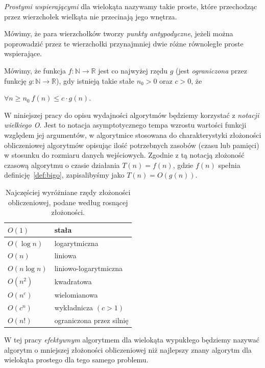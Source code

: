 \begin{definicja}
  \emph{Prostymi wspierającymi} dla wielokąta nazywamy takie proste,
  które przechodząc przez wierzchołek wielkąta nie przecinają jego
  wnętrza.
\end{definicja}

\begin{definicja}
  Mówimy, że para wierzchołków tworzy \emph{punkty antypodyczne},
  jeżeli można poprowadzić przez te wierzchołki przynajmniej dwie
  różne równoległe proste wspierające.
\end{definicja}

\begin{definicja}\label{def:bigo}
  Mówimy, że funkcja $f\colon \mathbb{N} \to \mathbb{R}$ jest co
  najwyżej rzędu $g$ (jest \emph{ograniczona} przez funkcję $g\colon
  \mathbb{N} \to \mathbb{R}$), gdy istnieją takie stałe $n_0 > 0$ oraz
  $c > 0$, że

  \begin{center}
    $\forall n \geq n_0\ f(n) \leq c \cdot g(n)$.
  \end{center}
\end{definicja}

W niniejszej pracy do opisu wydajności algorytmów będziemy korzystać z
\emph{notacji wielkiego O}. Jest to notacja asymptotycznego tempa
wzrostu wartości funkcji względem jej argumentów, w algorytmice
stosowana do charakterystyki złożoności obliczeniowej algorytmów
opisując ilość potrzebnych zasobów (czasu lub pamięci) w stosunku do
rozmiaru danych wejściowych. Zgodnie z tą notacją złożoność czasową
algorytmu o czasie działania $T(n) = f(n)$, gdzie $f(n)$ spełnia
definicję~\ref{def:bigo}, zapisalibyśmy jako $T(n) = O(g(n))$.

\begin{table}[htb]
  \centering

  \begin{tabular}{ll}
    \toprule
    $O(1)$ & stała \\
    \midrule
    $O(\log n)$ & logarytmiczna \\
    \midrule
    $O(n)$ & liniowa \\
    \midrule
    $O(n \log n)$ & liniowo-logarytmiczna \\
    \midrule
    $O(n^2)$ & kwadratowa \\
    \midrule
    $O(n^c)$ & wielomianowa \\
    \midrule
    $O(c^n)$ & wykładnicza $(c > 1)$ \\
    \midrule
    $O(n!)$ & ograniczona przez silnię \\
    \bottomrule
  \end{tabular}

  \caption{Najczęściej wyróżniane rzędy złożoności obliczeniowej,
    podane według rosnącej złożoności.}
\end{table}

W tej pracy \emph{efektywnym} algorytmem dla wielokąta wypukłego
będziemy nazywać algorytm o mniejszej złożoności obliczeniowej niż
najlepszy znany algorytm dla wielokąta prostego dla tego samego
problemu.


